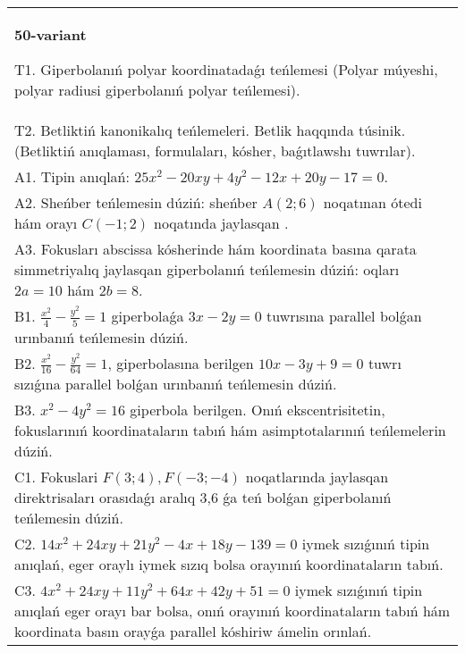 \documentclass{article}
\begin{document}
\begin{tabular}{m{17cm}}
\textbf{50-variant}
\newline

T1. Giperbolanıń polyar koordinatadaǵı teńlemesi (Polyar múyeshi, polyar radiusi giperbolanıń polyar teńlemesi).\\

T2. Betliktiń kanonikalıq teńlemeleri. Betlik haqqında túsinik. (Betliktiń anıqlaması, formulaları, kósher, baǵıtlawshı tuwrılar).\\

A1. Tipin anıqlań: $25 x^{2}-20 xy+4 y^{2}-12 x+20 y-17=0$.\\

A2. Sheńber teńlemesin dúziń: sheńber $A (2;6 ) $ noqatınan ótedi hám orayı $C (-1;2) $ noqatında jaylasqan .\\

A3. Fokusları abscissa kósherinde hám koordinata basına qarata simmetriyalıq jaylasqan giperbolanıń teńlemesin dúziń: oqları $2 a=10$ hám $2 b=8$.\\

B1. $\frac{x^{2}}{4} - \frac{y^{2}}{5} = 1$ giperbolaǵa $3x - 2y = 0$ tuwrısına parallel bolǵan urınbanıń teńlemesin dúziń.  \\

B2. $\frac{x^{2}}{16} - \frac{y^{2}}{64} = 1$, giperbolasına berilgen $10x - 3y + 9 = 0$ tuwrı sızıǵına parallel bolǵan urınbanıń teńlemesin dúziń.  \\

B3. $x^{2} - 4y^{2} = 16$ giperbola berilgen. Onıń ekscentrisitetin, fokuslarınıń koordinataların tabıń hám asimptotalarınıń teńlemelerin dúziń.\\

C1. Fokuslari $F(3;4), F(-3;-4)$ noqatlarında jaylasqan direktrisaları orasıdaǵı aralıq 3,6 ǵa teń bolǵan giperbolanıń teńlemesin dúziń.  \\

C2. $14x^{2} + 24xy + 21y^{2} - 4x + 18y - 139 = 0$ iymek sızıǵınıń tipin anıqlań, eger oraylı iymek sızıq bolsa orayınıń koordinataların tabıń.  \\

C3. $4x^{2} + 24xy + 11y^{2} + 64x + 42y + 51 = 0$ iymek sızıǵınıń tipin anıqlań eger orayı bar bolsa, onıń orayınıń koordinataların tabıń hám koordinata basın orayǵa parallel kóshiriw ámelin orınlań.  \\

\end{tabular}
\vspace{1cm}
\end{document}
